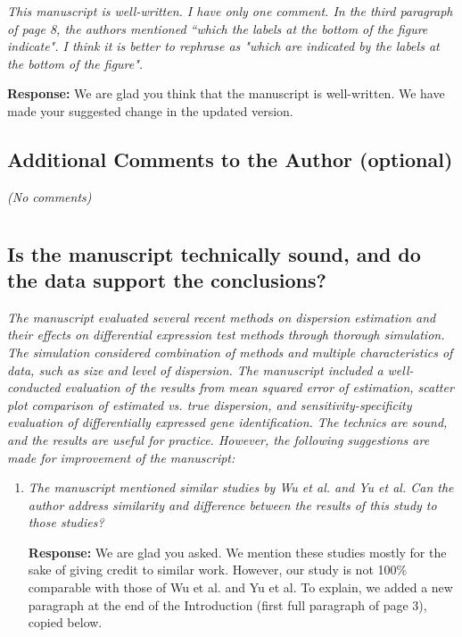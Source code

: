 \documentclass{article}
\providecommand{\q}{$\quad$ \newline}
\begin{document}
\begin{flushleft}
\emph{This manuscript is well-written. I have only one comment. In the third paragraph of page 8, the authors mentioned ``which the labels at the bottom of the figure indicate". I think it is better to rephrase as "which are indicated by the labels at the bottom of the figure".} \q

{\bf Response:} We are glad you think that the manuscript is well-written. We have made your suggested change in the updated version.



\subsection{Additional Comments to the Author (optional)}

\emph{(No comments)}

\section{}

\subsection{Is the manuscript technically sound, and do the data support the conclusions?}

\emph{The manuscript evaluated several recent methods on dispersion estimation and their effects on differential expression test methods through thorough simulation. The simulation considered combination of methods and multiple characteristics of data, such as size and level of dispersion. The manuscript included a well-conducted evaluation of the results from mean squared error of estimation, scatter plot comparison of estimated vs. true dispersion, and sensitivity-specificity evaluation of differentially expressed gene identification. The technics are sound, and the results are useful for practice. However, the following suggestions are made for improvement of the manuscript:} 

\begin{enumerate}
\item \emph{The manuscript mentioned similar studies by Wu et al. and Yu et al. Can the author address similarity and difference between the results of this study to those studies?} \q

{\bf Response:} We are glad you asked. We mention these studies mostly for the sake of giving credit to similar work. However, our study is not 100\% comparable with those of Wu et al. and Yu et al. To explain, we added a new paragraph at the end of the Introduction (first full paragraph of page 3), copied below. 


\end{enumerate}
\end{flushleft}
\end{document}
